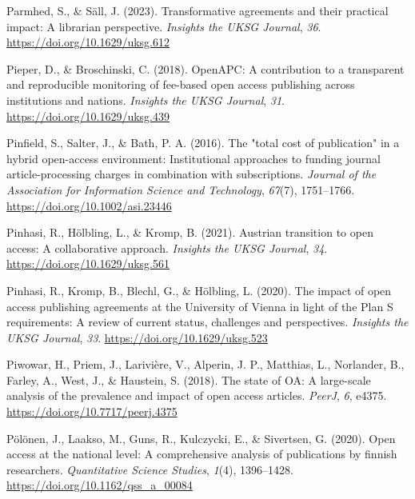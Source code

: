 \documentclass[a4paper,man,floatsintext,longtable,noextraspace,12pt]{apa6}
\newenvironment{CSLReferences}%
  {}%
  {\par}
\begin{document}
\begin{CSLReferences}{1}{0}
\leavevmode{}%
Parmhed, S., \& Säll, J. (2023). Transformative agreements and their
practical impact: A librarian perspective. \emph{Insights the UKSG
Journal}, \emph{36}. \url{https://doi.org/10.1629/uksg.612}

\leavevmode{}%
Pieper, D., \& Broschinski, C. (2018). {OpenAPC}: A contribution to a
transparent and reproducible monitoring of fee-based open access
publishing across institutions and nations. \emph{Insights the {UKSG}
Journal}, \emph{31}. \url{https://doi.org/10.1629/uksg.439}

\leavevmode{}%
Pinfield, S., Salter, J., \& Bath, P. A. (2016). The "total cost of
publication" in a hybrid open-access environment: Institutional
approaches to funding journal article-processing charges in combination
with subscriptions. \emph{Journal of the Association for Information
Science and Technology}, \emph{67}(7), 1751--1766.
\url{https://doi.org/10.1002/asi.23446}

\leavevmode{}%
Pinhasi, R., Hölbling, L., \& Kromp, B. (2021). Austrian transition to
open access: A collaborative approach. \emph{Insights the UKSG Journal},
\emph{34}. \url{https://doi.org/10.1629/uksg.561}

\leavevmode{}%
Pinhasi, R., Kromp, B., Blechl, G., \& Hölbling, L. (2020). The impact
of open access publishing agreements at the {University of Vienna} in
light of the {Plan S} requirements: A review of current status,
challenges and perspectives. \emph{Insights the UKSG Journal},
\emph{33}. \url{https://doi.org/10.1629/uksg.523}

\leavevmode{}%
Piwowar, H., Priem, J., Larivière, V., Alperin, J. P., Matthias, L.,
Norlander, B., Farley, A., West, J., \& Haustein, S. (2018). The state
of {OA}: A large-scale analysis of the prevalence and impact of open
access articles. \emph{{PeerJ}}, \emph{6}, e4375.
\url{https://doi.org/10.7717/peerj.4375}

\leavevmode{}%
Pölönen, J., Laakso, M., Guns, R., Kulczycki, E., \& Sivertsen, G.
(2020). Open access at the national level: A comprehensive analysis of
publications by finnish researchers. \emph{Quantitative Science
Studies}, \emph{1}(4), 1396--1428.
\url{https://doi.org/10.1162/qss_a_00084}


\end{CSLReferences}
\end{document}
